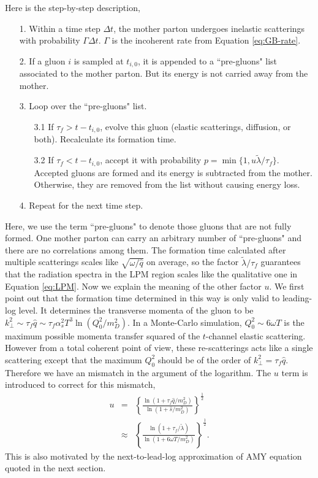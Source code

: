 \documentclass[aps, prc, reprint, amsmath, groupedaddress, nofootinbib]{revtex4-1}
\begin{document}
Here is the step-by-step description,
\begin{itemize}
\item[1.] Within a time step $\Delta t$, the mother parton undergoes inelastic scatterings with probability $\Gamma\Delta t$. $\Gamma$ is the incoherent rate from Equation \ref{eq:GB-rate}.
\item[2.] If a gluon $i$ is sampled at $t_{i,0}$, it is appended to a ``pre-gluons" list associated to the mother parton. But its energy is not carried away from the mother.
\item[3.] Loop over the ``pre-gluons" list. 
\begin{itemize}
\item[3.1] If $\tau_f > t-t_{i,0}$, evolve this gluon (elastic scatterings, diffusion, or both). Recalculate its formation time.
\item[3.2] If $\tau_f < t-t_{i,0}$, accept it with probability $p = \min\{1, u\tilde{\lambda}/\tau_f\}$. Accepted gluons are formed and its energy is subtracted from the mother. Otherwise, they are removed from the list without causing energy loss.
\end{itemize} 
\item[4.] Repeat for the next time step.
\end{itemize}
Here, we use the term ``pre-gluons" to denote those gluons that are not fully formed.
One mother parton can carry an arbitrary number of ``pre-gluons" and there are no correlations among them.
The formation time calculated after multiple scatterings scales like $\sqrt{\omega/\hat{q}}$ on average, so the factor $\tilde{\lambda}/\tau_f$ guarantees that the radiation spectra in the LPM region scales like the qualitative one in Equation \ref{eq:LPM}.
Now we explain the meaning of the other factor $u$.
We first point out that the formation time determined in this way is only valid to leading-log level.
It determines the transverse momenta of the gluon to be $k_\perp^2 \sim \tau_f \hat{q} \sim \tau_f \alpha_s^2 T^3 \ln(Q_0^2/m_D^2)$.
In a Monte-Carlo simulation, $Q_0^2\sim 6\omega T$ is the maximum possible momenta transfer squared of the $t$-channel elastic scattering.
However from a total coherent point of view, these re-scatterings acts like a single scattering except that the maximum $Q_0^2$ should be of the order of $k_\perp^2 = \tau_f \hat{q}$.
Therefore we have an mismatch in the argument of the logarithm.
The $u$ term is introduced to correct for this mismatch,
\begin{eqnarray}
\nonumber
u &=& \left\{\frac{\ln\left(1+\tau_f\hat{q}/m_D^2\right)}{\ln\left(1+\hat{s}/m_D^2\right)}\right\}^{\frac{1}{2}}\\
&\approx& \left\{\frac{\ln\left(1+\tau_f/\tilde{\lambda}\right)}{\ln\left(1+6\omega T/m_D^2\right)}\right\}^{\frac{1}{2}}.
\end{eqnarray} 
This is also motivated by the next-to-lead-log approximation of AMY equation quoted in the next section.
\end{document}
